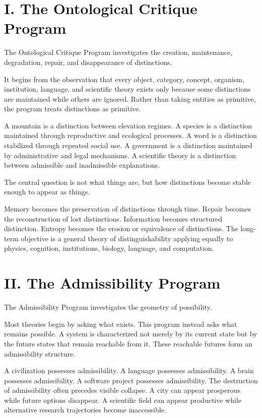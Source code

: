 \documentclass[12pt, openany]{book}
\begin{document}
\section{I. The Ontological Critique Program}

The Ontological Critique Program investigates the creation, maintenance,
degradation, repair, and disappearance of distinctions.

It begins from the observation that every object, category, concept,
organism, institution, language, and scientific theory exists only because
some distinctions are maintained while others are ignored. Rather than
taking entities as primitive, the program treats distinctions as primitive.

A mountain is a distinction between elevation regimes. A species is a
distinction maintained through reproductive and ecological processes. A word
is a distinction stabilized through repeated social use. A government is a
distinction maintained by administrative and legal mechanisms. A scientific
theory is a distinction between admissible and inadmissible explanations.

The central question is not what things are, but how distinctions become
stable enough to appear as things.

Memory becomes the preservation of distinctions through time. Repair becomes
the reconstruction of lost distinctions. Information becomes structured
distinction. Entropy becomes the erosion or equivalence of distinctions. The
long-term objective is a general theory of distinguishability applying
equally to physics, cognition, institutions, biology, language, and
computation.

\section{II. The Admissibility Program}

The Admissibility Program investigates the geometry of possibility.

Most theories begin by asking what exists. This program instead asks what
remains possible. A system is characterized not merely by its current state
but by the future states that remain reachable from it. These reachable
futures form an admissibility structure.

A civilization possesses admissibility. A language possesses admissibility.
A brain possesses admissibility. A software project possesses admissibility.
The destruction of admissibility often precedes visible collapse. A city can
appear prosperous while future options disappear. A scientific field can
appear productive while alternative research trajectories become inaccessible.
\end{document}
